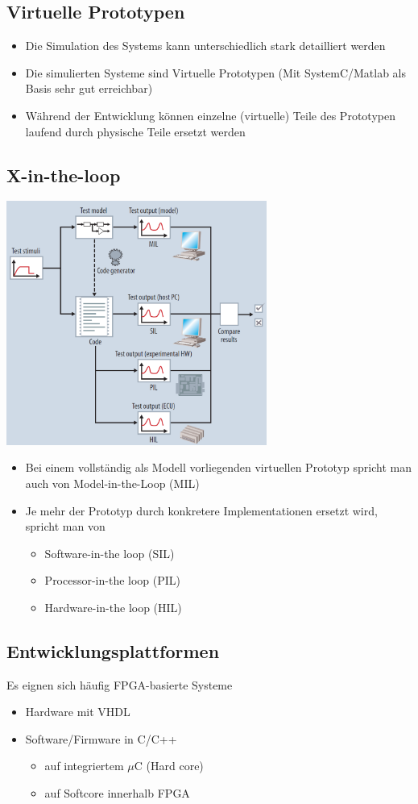 \subsection{Virtuelle Prototypen}
	\begin{itemize}
		\item Die Simulation des Systems kann unterschiedlich stark detailliert werden
		\item Die simulierten Systeme sind Virtuelle Prototypen (Mit SystemC/Matlab als Basis sehr gut erreichbar)
		\item Während der Entwicklung können einzelne (virtuelle) Teile des Prototypen laufend durch physische Teile ersetzt werden
	\end{itemize}
\pagebreak\newpage

\subsection{X-in-the-loop}
	\begin{multicols}{2}
		\includegraphics[height=8cm]{images/HWSWCodesign/X-in-the-loop}
		\columnbreak
		\begin{itemize}
			\item Bei einem vollständig als Modell vorliegenden virtuellen Prototyp spricht man auch von Model-in-the-Loop (MIL)
			\item Je mehr der Prototyp durch konkretere Implementationen ersetzt wird, spricht man von
			\begin{itemize}
				\item Software-in-the loop (SIL)
				\item Processor-in-the loop (PIL)
				\item Hardware-in-the loop (HIL)
			\end{itemize}
		\end{itemize}
	\end{multicols}

	\subsection{Entwicklungsplattformen}
	Es eignen sich häufig FPGA-basierte Systeme
	\begin{itemize}
		\item Hardware mit VHDL
		\item Software/Firmware in C/C++
		\begin{itemize}
			\item auf integriertem $\mu$C (Hard core)
			\item auf Softcore innerhalb FPGA
		\end{itemize}
	\end{itemize}

